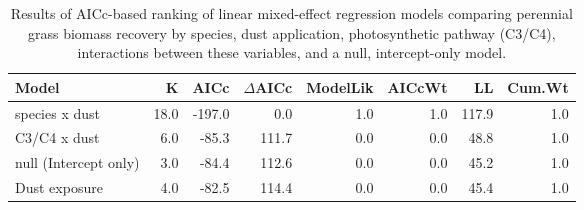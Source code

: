 \begin{table}[ht]
\centering
\begin{tabular}{lrrrrrrr}
  \hline
Model & K & AICc & $\Delta$AICc & ModelLik & AICcWt & LL & Cum.Wt \\ 
  \hline
species x dust & 18.0 & -197.0 & 0.0 & 1.0 & 1.0 & 117.9 & 1.0 \\ 
  C3/C4 x dust & 6.0 & -85.3 & 111.7 & 0.0 & 0.0 & 48.8 & 1.0 \\ 
  null (Intercept only) & 3.0 & -84.4 & 112.6 & 0.0 & 0.0 & 45.2 & 1.0 \\ 
  Dust exposure & 4.0 & -82.5 & 114.4 & 0.0 & 0.0 & 45.4 & 1.0 \\ 
   \hline
\end{tabular}
\caption{Results of AICc-based ranking of linear mixed-effect regression models comparing perennial grass biomass recovery by species, dust application, photosynthetic pathway (C3/C4), interactions between these variables, and a null, intercept-only model.} 
\label{tab:grassAIC}
\end{table}

